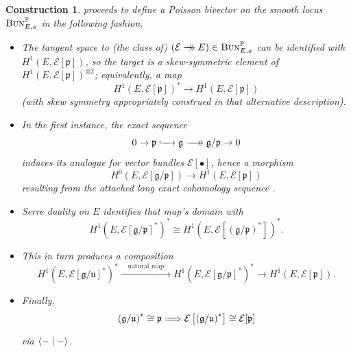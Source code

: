 \documentclass[11pt,leqno]{article}
\theoremstyle{plain}
\theoremstyle{plain}
\theoremstyle{plain}
\newtheorem{construction}[lemma]{Construction}
\numberwithin{equation}{section}
\theoremstyle{nonumberplain}
\newcommand\bP{{\mathbb P}}
\newcommand\cE{{\mathcal E}}
\newcommand\fg{{\mathfrak g}}
\newcommand\fp{{\mathfrak p}}
\newcommand\fu{{\mathfrak u}}
\newcommand\1{{\bf 1}}
\newcommand{\cat}[1]{\textsc{#1}}
\newcommand{\xrightarrowdbl}[2][]{%
  \xrightarrow[#1]{#2}\mathrel{\mkern-14mu}\rightarrow
}
\begin{document}
\begin{construction}\label{con:bunp.poiss.no.bialg}
  \cite[\S 3.1]{MR2396472} proceeds to define a Poisson bivector on the smooth locus $\cat{Bun}_{E,s}^{\bP}$ in the following fashion.
  \begin{itemize}[wide]
  \item The tangent space to (the class of) $\left(\cE\xrightarrowdbl{}E\right)\in \cat{Bun}_{E,s}^{\bP}$ can be identified with $H^1(E,\cE[\fp])$, so the target is a skew-symmetric element of $H^1(E,\cE[\fp])^{\otimes 2}$; equivalently, a map
    \begin{equation}\label{eq:h1past.2.h1p}
      H^1\left(E,\cE[\fp]\right)^*
      \xrightarrow{\quad}
      H^1\left(E,\cE[\fp]\right)
    \end{equation}
    (with skew symmetry appropriately construed in that alternative description).

  \item In the first instance, the exact sequence
    \begin{equation*}
      0\to
      \fp
      \lhook\joinrel\xrightarrow{\quad}
      \fg
      \xrightarrowdbl{\quad}
      \fg/\fp
      \to 0
    \end{equation*}
    induces its analogue for vector bundles $\cE[\bullet]$, hence a morphism
    \begin{equation*}
      H^0(E,\cE[\fg/\fp])
      \xrightarrow{\quad}
      H^1(E,\cE[\fp])
    \end{equation*}
    resulting from the attached long exact cohomology sequence \cite[Theorem III.1.1A]{hrt}.

  \item \emph{Serre duality} \cite[Theorem III.7.1]{hrt} on $E$ identifies that map's domain with
    \begin{equation*}
      H^1\left(E,\cE[\fg/\fp]^*\right)^*
      \cong
      H^1\left(E,\cE\left[(\fg/\fp)^*\right]\right)^*.
    \end{equation*}

  \item This in turn produces a composition
    \begin{equation*}
      H^1\left(E,\cE[\fg/\fu]^*\right)^*
      \xrightarrow{\quad\text{natural map}\quad}
      H^1\left(E,\cE[\fg/\fp]^*\right)^*
      \xrightarrow{\quad}
      H^1(E,\cE[\fp]).
    \end{equation*}

  \item Finally,
    \begin{equation*}
      \left(\fg/\fu\right)^*
      \cong
      \fp
      \xRightarrow{\quad}
      \cE\left[\left(\fg/\fu\right)^*\right]
      \cong
      \cE[\fp]
    \end{equation*}
    via $\Braket{-\mid-}$. 
  \end{itemize}
\end{construction}
\end{document}
